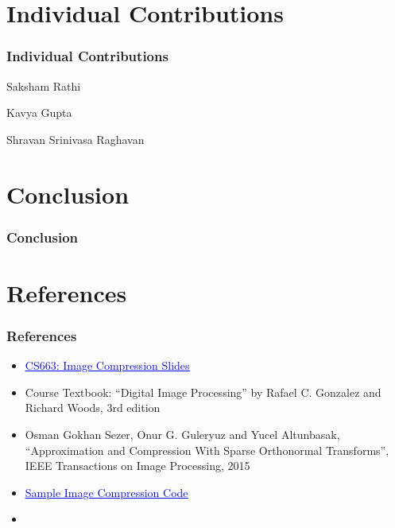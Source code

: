 \documentclass[Serif, 10pt, brown]{beamer}
\theoremstyle{example}
\theoremstyle{plain}
\begin{document}
\section{Individual Contributions}

\begin{frame}
	\frametitle{Individual Contributions}
	\begin{alertblock}{Saksham Rathi}
	\end{alertblock}
	\begin{alertblock}{Kavya Gupta}
	\end{alertblock}
	\begin{alertblock}{Shravan Srinivasa Raghavan}
	\end{alertblock}

\end{frame}
\section{Conclusion}
\begin{frame}
	\frametitle{Conclusion}
\end{frame}

\section{References}

\begin{frame}
	\frametitle{References}
	\begin{itemize}
		\item \href{https://docs.google.com/presentation/d/1-8xCg7o8Vtc9ghJf6y1Nkq9-TV0qSNfX/edit?usp=sharing&ouid=115909013767952805958&rtpof=true&sd=true}{\textcolor{blue}{\underline{CS663: Image Compression Slides}}}
		\item Course Textbook: ``Digital Image Processing'' by Rafael C. Gonzalez and Richard Woods, 3rd edition
		\item Osman Gokhan Sezer, Onur G. Guleryuz and Yucel Altunbasak, ``Approximation and Compression With Sparse Orthonormal Transforms'', IEEE Transactions on Image Processing, 2015
		\item \href{https://github.com/jeremyfell/image-compression/blob/master/image-compression.py}{\textcolor{blue}{\underline{Sample Image Compression Code}}}
		\item 
	\end{itemize}
\end{frame}
\end{document}
